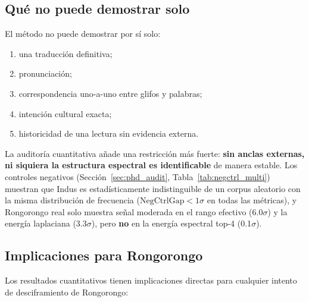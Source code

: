 \documentclass[11pt,a4paper]{article}
\newcommand{\1}{\mathbf{1}}
\numberwithin{equation}{section}
\begin{document}
\subsection{Qué no puede demostrar solo}

El método no puede demostrar por sí solo:
\begin{enumerate}[label=(\roman*)]
    \item una traducción definitiva;
    \item pronunciación;
    \item correspondencia uno-a-uno entre glifos y palabras;
    \item intención cultural exacta;
    \item historicidad de una lectura sin evidencia externa.
\end{enumerate}

La auditoría cuantitativa añade una restricción más fuerte: \textbf{sin anclas externas, ni siquiera la estructura espectral es identificable} de manera estable. Los controles negativos (Sección~\ref{sec:phd_audit}, Tabla~\ref{tab:negctrl_multi}) muestran que Indus es estadísticamente indistinguible de un corpus aleatorio con la misma distribución de frecuencia ($\mathrm{NegCtrlGap} < 1\sigma$ en todas las métricas), y Rongorongo real solo muestra señal moderada en el rango efectivo (6.0$\sigma$) y la energía laplaciana (3.3$\sigma$), pero \textbf{no} en la energía espectral top-4 (0.1$\sigma$).

\subsection{Implicaciones para Rongorongo}

Los resultados cuantitativos tienen implicaciones directas para cualquier intento de desciframiento de Rongorongo:
\end{document}
